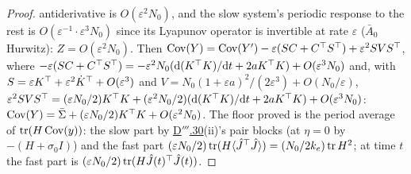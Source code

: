 \begin{proof}
antiderivative is $O(\varepsilon^2N_0)$, and the slow system's periodic response to the rest is
$O(\varepsilon^{-1}\cdot\varepsilon^3N_0)$ since its Lyapunov operator is invertible at rate $\varepsilon$
($\bar A_0$ Hurwitz): $Z = O(\varepsilon^2N_0)$. Then
$\operatorname{Cov}(Y) = \operatorname{Cov}(Y') - \varepsilon(SC + C^\top S^\top) + \varepsilon^2SVS^\top$, where
$-\varepsilon(SC + C^\top S^\top) = -\varepsilon^2N_0(\mathrm{d}(K^\top K)/\mathrm{d}t + 2aK^\top K) + O(\varepsilon^3N_0)$
and, with $S = \varepsilon K^\top + \varepsilon^2\dot K^\top + O(\varepsilon^3)$ and
$V = N_0(1 + \varepsilon a)^2/(2\varepsilon^3) + O(N_0/\varepsilon)$,
$\varepsilon^2SVS^\top = (\varepsilon N_0/2)K^\top K + (\varepsilon^2N_0/2)(\mathrm{d}(K^\top K)/\mathrm{d}t + 2aK^\top K)
+ O(\varepsilon^3N_0)$:
$\operatorname{Cov}(Y) = \bar\Sigma + (\varepsilon N_0/2)K^\top K + O(\varepsilon^2N_0)$. The floor proved is the period
average of $\operatorname{tr}(H\operatorname{Cov}(y))$: the slow part by \hyperref[res:thmDppp:30]{D$'''$.30}(ii)'s pair blocks (at
$\eta = 0$ by $-(H + \sigma_0I)$) and the fast part
$(\varepsilon N_0/2)\operatorname{tr}(H\langle\hat J^\top\hat J\rangle) = (N_0/2k_e)\operatorname{tr} H^2$; at time $t$ the fast part is
$(\varepsilon N_0/2)\operatorname{tr}(H\hat J(t)^\top\hat J(t))$.
\end{proof}

